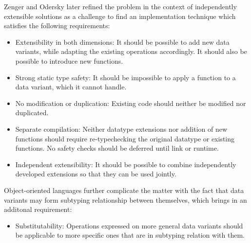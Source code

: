 \documentclass[preprint]{sigplanconf}
\begin{document}
Zenger and Odersky later refined the problem in the context of independently 
extensible solutions\cite{fool12} as a challenge to find an implementation 
technique which satisfies the following requirements:

\begin{itemize}
\setlength{\itemsep}{0pt}
\setlength{\parskip}{0pt}
\item Extensibility in both dimensions: It should be possible to add new data 
      variants, while adapting the existing operations accordingly. It should 
      also be possible to introduce new functions.
\item Strong static type safety: It should be impossible to apply a function to 
      a data variant, which it cannot handle.
\item No modification or duplication: Existing code should neither be modified 
      nor duplicated.
\item Separate compilation: Neither datatype extensions nor addition of new 
      functions should require re-typechecking the original datatype or 
      existing functions. No safety checks should be deferred until link or 
      runtime.
\item Independent extensibility: It should be possible to combine independently 
      developed extensions so that they can be used jointly.
\end{itemize}


\noindent
Object-oriented languages further complicate the matter with the fact that 
data variants may form subtyping relationship between themselves, which brings 
in an additonal requirement:

\begin{itemize}
\setlength{\itemsep}{0pt}
\setlength{\parskip}{0pt}
\item Substitutability: Operations expressed on more general data variants 
      should be applicable to more specific ones that are in subtyping relation 
      with them.
\end{itemize}

\end{document}
